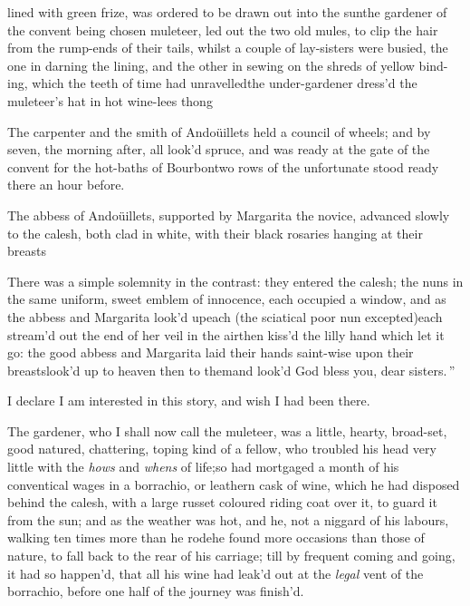 \documentclass{article}
\begin{document}
\noindent
{}\break
lined with green frize,
was ordered to be drawn out into the sun\tsk the gardener of the
convent being chosen muleteer, led out the two old mules, to clip
the hair from the rump-ends of their tails, whilst a couple of
lay-sisters were busied, the one in darning the lining, and the
other in sewing on the shreds of yellow bind-
ing, which the teeth of time had un\-ravelled\tsh the under-gardener dress’d
the muleteer’s hat in hot wine-lees\tsh\break 
{}
thong\tsh

\tsh The carpenter and the smith of Andoüillets held a council
of wheels; and by seven, the morning after, all look’d spruce,
and was ready at the gate of the convent for the hot-baths of
Bourbon\tsk\break two rows of the unfortunate stood ready there an
hour before.

The abbess of Andoüillets, supported by Margarita the novice, advanced slowly to the
calesh, both clad in white, with their black rosaries hanging at their breasts\tsh

\tsh There was a simple solemnity\break
in the contrast: they entered the calesh;\break
the nuns in the same uniform, sweet\break
emblem of innocence, each occupied a\break
window, and as the abbess and Margarita\break
look’d up\tsk each (the sciatical poor nun\break
excepted)\tsk each stream’d out the end of\break
her veil in the air\tsk then kiss’d the lilly\break
hand which let it go: the good abbess\break
and Margarita laid their hands saint-wise\break
upon their breasts\tsk look’d up to heaven\break
\tsk then to them\tsk and look’d \lqq God bless\break
\lqq you, dear sisters.\,”

I declare I am interested in this story, and wish I had been
there.

The gardener, who I shall now call the muleteer, was a little,
hearty, broad-set, good natured, chattering, toping kind of a
fellow, who troubled his head very little with the \textit{hows} and
\textit{whens} of life;\break so had mortgaged a month of his conventical
wages in a borrachio, or leathern cask of wine, which he had
disposed behind the calesh, with a large russet coloured
riding coat over it, to guard it from the sun; and as the weather
was hot, and he, not a niggard of his labours, walking ten times
more than he rode\tsk he found more occasions than those of
nature, to fall back to the rear of his carriage; till by frequent
coming and going, it had so happen’d, that all his wine had
leak’d out at the \textit{legal} vent of\break
the borrachio, before one half of the\break
journey was finish’d.
\end{document}
